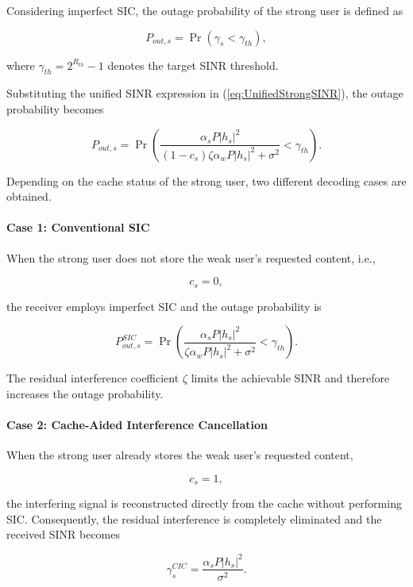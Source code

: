 \documentclass[12pt,a4paper]{article}
\begin{document}
Considering imperfect SIC, the outage probability of the strong user is defined as

\begin{equation}
P_{out,s}
=
\Pr
\left(
\gamma_s
<
\gamma_{th}
\right),
\end{equation}

where $\gamma_{th}=2^{R_{th}}-1$ denotes the target SINR threshold.

Substituting the unified SINR expression in (\ref{eq:UnifiedStrongSINR}), the outage probability becomes

\begin{equation}
P_{out,s}
=
\Pr
\left(
\frac{\alpha_sP|h_s|^2}
{(1-c_s)\zeta\alpha_wP|h_s|^2+\sigma^2}
<
\gamma_{th}
\right).
\end{equation}

Depending on the cache status of the strong user, two different decoding cases are obtained.

\paragraph*{Case 1: Conventional SIC}

When the strong user does not store the weak user's requested content, i.e.,

\[
c_s=0,
\]

the receiver employs imperfect SIC and the outage probability is

\begin{equation}
P_{out,s}^{SIC}
=
\Pr
\left(
\frac{\alpha_sP|h_s|^2}
{\zeta\alpha_wP|h_s|^2+\sigma^2}
<
\gamma_{th}
\right).
\end{equation}

The residual interference coefficient $\zeta$ limits the achievable SINR and therefore increases the outage probability.

\paragraph*{Case 2: Cache-Aided Interference Cancellation}

When the strong user already stores the weak user's requested content,

\[
c_s=1,
\]

the interfering signal is reconstructed directly from the cache without performing SIC. Consequently, the residual interference is completely eliminated and the received SINR becomes

\begin{equation}
\gamma_s^{CIC}
=
\frac{\alpha_sP|h_s|^2}
{\sigma^2}.
\end{equation}
\end{document}
